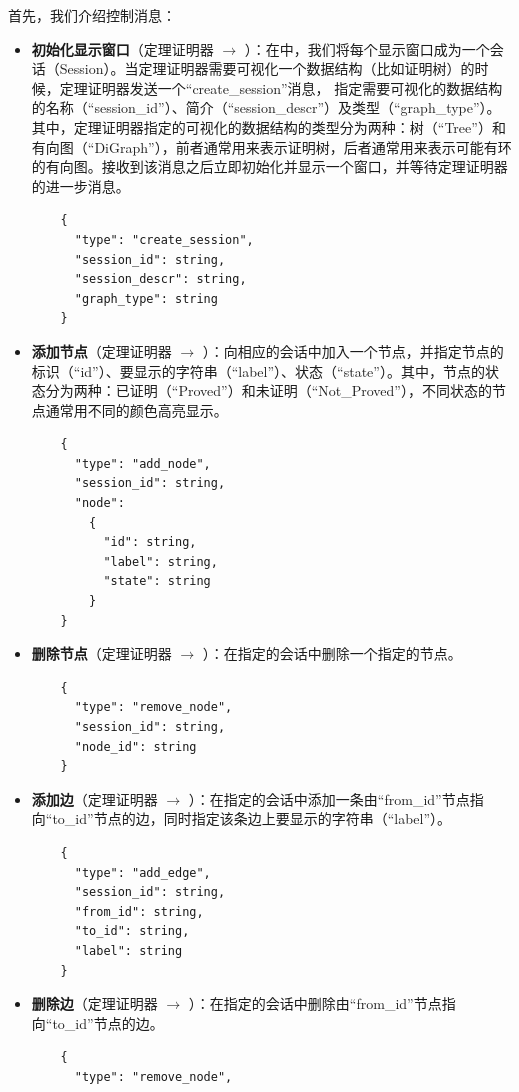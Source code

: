 首先，我们介绍控制消息：
\begin{itemize}
	\item \textbf{初始化显示窗口}（{定理证明器} $\longrightarrow$ ）：在中，我们将每个显示窗口成为一个会话（Session）。当定理证明器需要可视化一个数据结构（比如证明树）的时候，定理证明器发送一个“create\_session”消息， 指定需要可视化的数据结构的名称（“session\_id”）、简介（“session\_descr”）及类型（“graph\_type”）。其中，定理证明器指定的可视化的数据结构的类型分为两种：树（“Tree”）和有向图（“DiGraph”），前者通常用来表示证明树，后者通常用来表示可能有环的有向图。接收到该消息之后立即初始化并显示一个窗口，并等待定理证明器的进一步消息。
	\begin{verbatim}
	{
	  "type": "create_session",
	  "session_id": string,
	  "session_descr": string,
	  "graph_type": string
	}
	\end{verbatim}
	\item \textbf{添加节点}（定理证明器 $\longrightarrow$ ）：向相应的会话中加入一个节点，并指定节点的标识（“id”）、要显示的字符串（“label”）、状态（“state”）。其中，节点的状态分为两种：已证明（“Proved”）和未证明（“Not\_Proved”），不同状态的节点通常用不同的颜色高亮显示。
	\begin{verbatim}
	{
	  "type": "add_node",
	  "session_id": string,
	  "node":
	    {
	      "id": string,
	      "label": string,
	      "state": string
	    }
	}
	\end{verbatim}
	\item \textbf{删除节点}（定理证明器 $\longrightarrow$ ）：在指定的会话中删除一个指定的节点。
	\begin{verbatim}
	{
	  "type": "remove_node",
	  "session_id": string,
	  "node_id": string
	}
	\end{verbatim}
	\item \textbf{添加边}（定理证明器 $\longrightarrow$ ）：在指定的会话中添加一条由“from\_id”节点指向“to\_id”节点的边，同时指定该条边上要显示的字符串（“label”）。
	\begin{verbatim}
	{
	  "type": "add_edge",
	  "session_id": string,
	  "from_id": string,
	  "to_id": string,
	  "label": string
	}
	\end{verbatim}
	\item \textbf{删除边}（定理证明器 $\longrightarrow$ ）：在指定的会话中删除由“from\_id”节点指向“to\_id”节点的边。
	\begin{verbatim}
	{
	  "type": "remove_node",

\end{verbatim}
\end{itemize}
